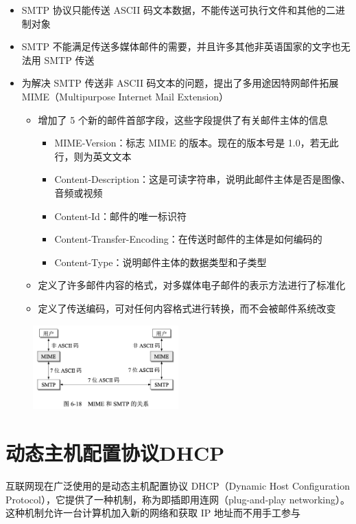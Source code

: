 \documentclass[cs4size,a4paper,10pt]{ctexart}
\begin{document}
	\begin{itemize}
		\item SMTP 协议只能传送 ASCII 码文本数据，不能传送可执行文件和其他的二进制对象
		\item SMTP 不能满足传送多媒体邮件的需要，并且许多其他非英语国家的文字也无法用 SMTP 传送
		\item 为解决 SMTP 传送非 ASCII 码文本的问题，提出了多用途因特网邮件拓展 MIME（Multipurpose Internet Mail Extension）
		\begin{itemize}
			\item 增加了 5 个新的邮件首部字段，这些字段提供了有关邮件主体的信息
			\begin{itemize}
				\item MIME-Version：标志 MIME 的版本。现在的版本号是 1.0，若无此行，则为英文文本
				\item Content-Description：这是可读字符串，说明此邮件主体是否是图像、音频或视频
				\item Content-Id：邮件的唯一标识符
				\item Content-Transfer-Encoding：在传送时邮件的主体是如何编码的
				\item Content-Type：说明邮件主体的数据类型和子类型
			\end{itemize}
			\item 定义了许多邮件内容的格式，对多媒体电子邮件的表示方法进行了标准化
			\item 定义了传送编码，可对任何内容格式进行转换，而不会被邮件系统改变
		\end{itemize}
	\end{itemize}

	\begin{figure}[H]
		\centering
		\includegraphics[width=0.5\textwidth]{img/6.18}
	\end{figure}

	\section{动态主机配置协议DHCP}

	互联网现在广泛使用的是动态主机配置协议 DHCP（Dynamic Host Configuration Protocol），它提供了一种机制，称为即插即用连网（plug-and-play networking）。这种机制允许一台计算机加入新的网络和获取 IP 地址而不用手工参与
\end{document}
